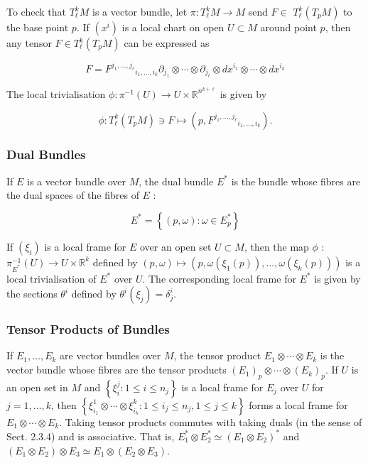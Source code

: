 \documentclass[10pt, letterpaper]{article}
\begin{document}
To check that $T_{\ell}^{k} M$ is a vector bundle, let $\pi: T_{\ell}^{k} M \rightarrow M$ send $F \in$ $T_{\ell}^{k}\left(T_{p} M\right)$ to the base point $p$. If $\left(x^{i}\right)$ is a local chart on open $U \subset M$ around point $p$, then any tensor $F \in T_{\ell}^{k}\left(T_{p} M\right)$ can be expressed as

$$
F=F^{j_{1}, \ldots, j_{\ell}}{ }_{i_{1}, \ldots, i_{k}} \partial_{j_{1}} \otimes \cdots \otimes \partial_{j_{\ell}} \otimes d x^{i_{1}} \otimes \cdots \otimes d x^{i_{k}}
$$

The local trivialisation $\phi: \pi^{-1}(U) \rightarrow U \times \mathbb{R}^{n^{k+\ell}}$ is given by

$$
\phi: T_{\ell}^{k}\left(T_{p} M\right) \ni F \longmapsto\left(p, F^{j_{1}, \ldots, j_{\ell}}{ }_{i_{1}, \ldots, i_{k}}\right) .
$$

\subsubsection*{Dual Bundles}
If $E$ is a vector bundle over $M$, the dual bundle $E^{*}$ is the bundle whose fibres are the dual spaces of the fibres of $E$ :

$$
E^{*}=\left\{(p, \omega): \omega \in E_{p}^{*}\right\}
$$

If $\left(\xi_{i}\right)$ is a local frame for $E$ over an open set $U \subset M$, then the map $\phi$ : $\pi_{E^{*}}^{-1}(U) \rightarrow U \times \mathbb{R}^{k}$ defined by $(p, \omega) \mapsto\left(p, \omega\left(\xi_{1}(p)\right), \ldots, \omega\left(\xi_{k}(p)\right)\right)$ is a local trivialisation of $E^{*}$ over $U$. The corresponding local frame for $E^{*}$ is given by the sections $\theta^{i}$ defined by $\theta^{i}\left(\xi_{j}\right)=\delta_{j}^{i}$.

\subsubsection*{Tensor Products of Bundles}
If $E_{1}, \ldots, E_{k}$ are vector bundles over $M$, the tensor product $E_{1} \otimes \cdots \otimes E_{k}$ is the vector bundle whose fibres are the tensor products $\left(E_{1}\right)_{p} \otimes \cdots \otimes\left(E_{k}\right)_{p}$. If $U$ is an open set in $M$ and $\left\{\xi_{i}^{j}: 1 \leq i \leq n_{j}\right\}$ is a local frame for $E_{j}$ over $U$ for $j=1, \ldots, k$, then $\left\{\xi_{i_{1}}^{1} \otimes \cdots \otimes \xi_{i_{k}}^{k}: 1 \leq i_{j} \leq n_{j}, 1 \leq j \leq k\right\}$ forms a local frame for $E_{1} \otimes \cdots \otimes E_{k}$. Taking tensor products commutes with taking duals (in the sense of Sect. 2.3.4) and is associative. That is, $E_{1}^{*} \otimes E_{2}^{*} \simeq\left(E_{1} \otimes E_{2}\right)^{*}$ and $\left(E_{1} \otimes E_{2}\right) \otimes E_{3} \simeq E_{1} \otimes\left(E_{2} \otimes E_{3}\right)$.
\end{document}
